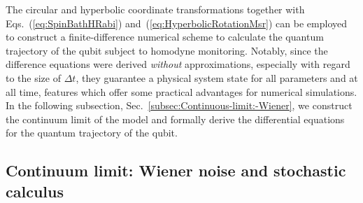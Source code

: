 The circular and hyperbolic coordinate transformations together with
Eqs.~(\ref{eq:SpinBathHRabi}) and~(\ref{eq:HyperbolicRotationMsr})
can be employed to construct a finite-difference numerical scheme
to calculate the quantum trajectory of the qubit subject to homodyne
monitoring. Notably, since the difference equations were derived \emph{without}
approximations, especially with regard to the size of $\Delta t$,
they guarantee a physical system state for all parameters and at all
time, features which offer some practical advantages for numerical
simulations. In the following subsection, Sec.~\ref{subsec:Continuous-limit:-Wiener},
we construct the continuum limit of the model and formally derive
the differential equations for the quantum trajectory of the qubit.


\subsection{Continuum limit: Wiener noise and stochastic calculus\label{subsec:Continuous-limit:-Wiener}}

